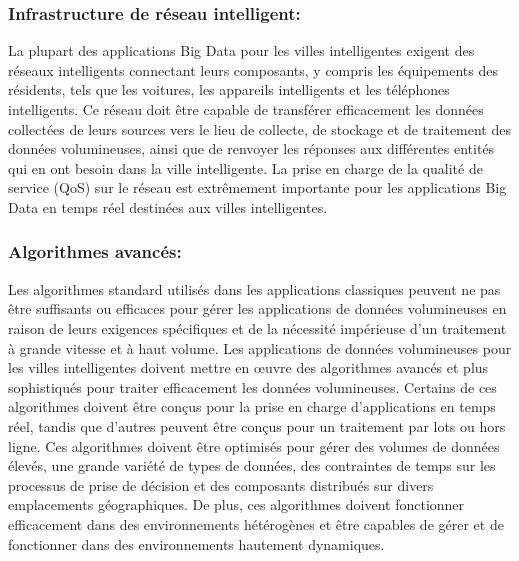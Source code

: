 \documentclass[french, a4paper, 12pt]{report}
\begin{document}
\subsubsection{Infrastructure de réseau intelligent:}

La plupart des applications Big Data pour les villes intelligentes exigent des réseaux intelligents connectant leurs composants, y compris les équipements des résidents, tels que les voitures, les appareils intelligents et les téléphones intelligents. Ce réseau doit être capable de transférer efficacement les données collectées de leurs sources vers le lieu de collecte, de stockage et de traitement des données volumineuses, ainsi que de renvoyer les réponses aux différentes entités qui en ont besoin dans la ville intelligente. La prise en charge de la qualité de service (QoS) sur le réseau est extrêmement importante pour les applications Big Data en temps réel destinées aux villes intelligentes. \\
\subsubsection{Algorithmes avancés:}
Les algorithmes standard utilisés dans les applications classiques peuvent ne pas être suffisants ou efficaces pour gérer les applications de données volumineuses en raison de leurs exigences spécifiques et de la nécessité impérieuse d'un traitement à grande vitesse et à haut volume. Les applications de données volumineuses pour les villes intelligentes doivent mettre en œuvre des algorithmes avancés et plus sophistiqués pour traiter efficacement les données volumineuses. Certains de ces algorithmes doivent être conçus pour la prise en charge d'applications en temps réel, tandis que d'autres peuvent être conçus pour un traitement par lots ou hors ligne. Ces algorithmes doivent être optimisés pour gérer des volumes de données élevés, une grande variété de types de données, des contraintes de temps sur les processus de prise de décision et des composants distribués sur divers emplacements géographiques. De plus, ces algorithmes doivent fonctionner efficacement dans des environnements hétérogènes et être capables de gérer et de fonctionner dans des environnements hautement dynamiques.\\
\end{document}
